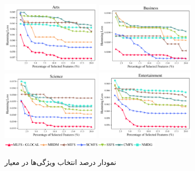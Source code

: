 \begin{figure}
	\centering
	{\includegraphics[width=0.43\textwidth]{figures/Hamming Loss/PSF(Arts).pdf}}
	{\includegraphics[width=0.43\textwidth]{figures/Hamming Loss/PSF(Business).pdf}}
	\\
	{\includegraphics[width=0.43\textwidth]{figures/Hamming Loss/PSF(Science).pdf}}
	{\includegraphics[width=0.43\textwidth]{figures/Hamming Loss/PSF(Entertainment).pdf}}
	{\includegraphics[width=0.7\textwidth]{figures/Micro/FL.pdf}}
	\caption{نمودار درصد انتخاب ویژگی‌ها در معیار  }
	\label{fig:fhml}
\end{figure}
